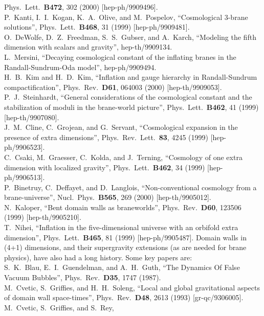 \documentclass[a4paper,12pt]{article}
\begin{document}
\begin{thebibliography}{99}
Phys.\ Lett.\  {\bf B472}, 302 (2000)
[hep-ph/9909496].
\\
P.~Kanti, I.~I.~Kogan, K.~A.~Olive, and M.~Pospelov,
``Cosmological 3-brane solutions'',
Phys.\ Lett.\  {\bf B468}, 31 (1999)
[hep-ph/9909481].
\\
O.~DeWolfe, D.~Z.~Freedman, S.~S.~Gubser, and A.~Karch,
``Modeling the fifth dimension with scalars and gravity'',
hep-th/9909134.
\\
L.~Mersini,
``Decaying cosmological constant of the inflating branes in the  
Randall-Sundrum-Oda model'',
hep-ph/9909494.
\\
H.~B.~Kim and H.~D.~Kim,
``Inflation and gauge hierarchy in Randall-Sundrum compactification'',
Phys.\ Rev.\  {\bf D61}, 064003 (2000)
[hep-th/9909053].
\\
P.~J.~Steinhardt,
``General considerations of the cosmological constant and the  
stabilization of moduli in the brane-world picture'',
Phys.\ Lett.\  {\bf B462}, 41 (1999)
[hep-th/9907080].
\\
J.~M.~Cline, C.~Grojean, and G.~Servant,
``Cosmological expansion in the presence of extra dimensions'',
Phys.\ Rev.\ Lett.\  {\bf 83}, 4245 (1999)
[hep-ph/9906523].
\\
C.~Csaki, M.~Graesser, C.~Kolda, and J.~Terning,
``Cosmology of one extra dimension with localized gravity'',
Phys.\ Lett.\  {\bf B462}, 34 (1999)
[hep-ph/9906513].
\\
P.~Binetruy, C.~Deffayet, and D.~Langlois,
``Non-conventional cosmology from a brane-universe'',
Nucl.\ Phys.\  {\bf B565}, 269 (2000)
[hep-th/9905012].
\\
N.~Kaloper,
``Bent domain walls as braneworlds'',
Phys.\ Rev.\  {\bf D60}, 123506 (1999)
[hep-th/9905210].
\\
T.~Nihei,
``Inflation in the five-dimensional universe with an orbifold 
extra dimension'',
Phys.\ Lett.\  {\bf B465}, 81 (1999)
[hep-ph/9905487].
Domain walls in (4+1) dimensions, and their supergravity extensions
(as are needed for brane physics), have also had a long history. Some
key papers are:
\\
S.~K.~Blau, E.~I.~Guendelman, and A.~H.~Guth,
``The Dynamics Of False Vacuum Bubbles'',
Phys.\ Rev.\  {\bf D35}, 1747 (1987).
\\
M.~Cvetic, S.~Griffies, and H.~H.~Soleng,
``Local and global gravitational aspects of domain wall space-times'',
Phys.\ Rev.\  {\bf D48}, 2613 (1993)
[gr-qc/9306005].
\\
M.~Cvetic, S.~Griffies, and S.~Rey,

\end{thebibliography}
\end{document}
